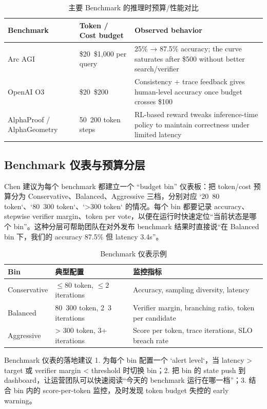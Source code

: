 \documentclass[a4paper]{article}
\begin{document}
\begin{table}[H]
\centering
\caption{主要 Benchmark 的推理时预算/性能对比}
\begin{tabular}{p{}p{}p{}}
\toprule
Benchmark & Token / Cost budget & Observed behavior \\
\midrule
Arc AGI & \$20~\$1,000 per query & 25\% → 87.5\% accuracy; the curve saturates after \$500 without better search/verifier \\
OpenAI O3 & \$20~\$200 & Consistency + trace feedback gives human-level accuracy once budget crosses \$100 \\
AlphaProof / AlphaGeometry & 50~200 token steps & RL-based reward tweaks inference-time policy to maintain correctness under limited latency \\
\bottomrule
\end{tabular}
\end{table}

\subsection{Benchmark 仪表与预算分层}
Chen 建议为每个 benchmark 都建立一个 ``budget bin'' 仪表板：把 token/cost 预算分为 Conservative、Balanced、Aggressive 三档，分别对应 `20~80 token`、`80~300 token`、`>300 token` 的情况。每个 bin 都要记录 accuracy、stepwise verifier margin、token per vote，以便在运行时快速定位“当前状态是哪个 bin”。这种分层可帮助团队在对外发布 benchmark 结果时直接说“在 Balanced bin 下，我们的 accuracy 87.5\% 但 latency 3.4s”。

\begin{table}[H]
\centering
\caption{Benchmark 仪表示例}
\begin{tabular}{p{}p{}p{}}
\toprule
Bin & 典型配置 & 监控指标 \\
\midrule
Conservative & $\leq 80$ token, $\leq 2$ iterations & Accuracy, sampling diversity, latency \\
Balanced & 80~300 token, 2~3 iterations & Verifier margin, branching ratio, token per candidate \\
Aggressive & > 300 token, 3+ iterations & Score per token, trace iterations, SLO breach rate \\
\bottomrule
\end{tabular}
\end{table}

\begin{importantbox}{Benchmark 仪表的落地建议}
1. 为每个 bin 配置一个 `alert level`，当 latency > target 或 verifier margin < threshold 时切换 bin；2. 把 bin 的 state push 到 dashboard，让运营团队可以快速阅读“今天的 benchmark 运行在哪一档”；3. 结合 bin 内的 score-per-token 监控，及时发现 token budget 失控的 early warning。
\end{importantbox}
\end{document}
